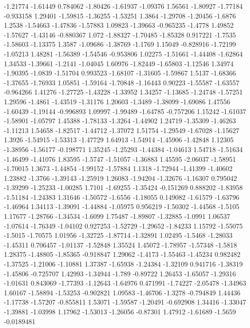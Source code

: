 \documentclass[9pt]{article}
\theoremstyle{plain}
\theoremstyle{definition}
\theoremstyle{remark}
\numberwithin{equation}{section}
\begin{document}
-1.21774
-1.61449
0.784062
-1.80426
-1.61937
-1.09376
1.56561
-1.80927
-1.77184
-0.933158
1.29401
-1.59815
-1.36255
-1.53251
1.3864
-1.29708
-1.20456
-1.6876
1.2538
-1.54663
-1.47836
-1.57883
1.09823
-1.39663
-0.965235
-1.4778
1.49852
-1.57627
-1.43146
-0.880367
1.072
-1.88327
-1.70485
-1.85328
0.917221
-1.7535
-1.58603
-1.13375
1.3587
-1.09686
-1.38769
-1.1769
1.15049
-0.828916
-1.72199
-1.05213
1.48281
-1.56389
-1.54546
-0.953806
1.02275
-1.51661
-1.44408
-1.62864
1.34533
-1.39661
-1.2141
-1.04045
1.60976
-1.82449
-1.65803
-1.12546
1.34974
-1.90395
-1.0839
-1.51704
0.993523
-1.68107
-1.31605
-1.59867
1.5137
-1.68366
-1.37655
-1.76933
1.05851
-1.59164
-1.70848
-1.16443
0.90223
-1.55587
-1.63557
-0.964266
1.41276
-1.27725
-1.43228
-1.33952
1.34257
-1.13685
-1.24748
-1.57251
1.29596
-1.4861
-1.43519
-1.31176
1.20603
-1.3489
-1.38099
-1.69086
1.47556
-1.60439
-1.19144
-0.996893
1.09997
-1.99489
-1.64785
-0.757206
1.15242
-1.61037
-1.58901
-1.05797
1.45388
-1.78133
-1.3264
-1.44902
1.24719
-1.35309
-1.46263
-1.11213
1.54658
-1.82517
-1.44712
-1.37072
1.51754
-1.29549
-1.67028
-1.15627
1.3926
-1.54915
-1.53313
-1.47729
1.64913
-1.54914
-1.45906
-1.42848
1.12305
-1.38956
-1.56177
-0.198771
1.35245
-1.25293
-1.44384
-1.04613
1.54718
-1.51634
-1.46499
-1.41076
1.83595
-1.5747
-1.51057
-1.36883
1.45595
-2.06037
-1.58951
-1.70015
1.3673
-1.44854
-1.99152
-1.57884
1.1318
-1.72944
-1.41399
-1.40602
1.23882
-1.3766
-1.39143
-1.25919
1.26083
-1.94204
-1.32676
-1.16307
0.795042
-1.39299
-1.25233
-1.00285
1.7101
-1.69255
-1.35424
-0.151269
0.888202
-1.83958
-1.51184
-1.24383
1.31646
-1.50572
-1.6556
-1.18055
0.149082
-1.61579
-1.63796
-1.46964
1.34113
-1.39091
-1.44884
-1.05975
0.956219
-1.50302
-1.44568
-1.5105
1.17677
-1.28766
-1.34534
-1.6099
1.75487
-1.89807
-1.32885
-1.0991
1.06537
-1.07614
-1.76349
-1.04102
0.927253
-1.52729
-1.29652
-1.84233
1.15792
-1.55075
-1.5015
-1.70575
1.01956
-1.32725
-1.87714
-1.32891
1.02495
-1.5468
-1.28033
-1.45311
0.706457
-1.01137
-1.52848
1.35524
1.45072
-1.78957
-1.57348
-1.5818
1.28375
-1.48805
-1.85365
-0.918847
1.29062
-1.4173
-1.55463
-1.45234
0.982482
-1.37525
-1.21006
-1.10881
1.37387
-1.65938
-1.24384
-1.32109
0.941716
-1.38319
-1.45806
-0.725707
1.42993
-1.34944
-1.789
-0.89722
1.26453
-1.65057
-1.29316
-1.01631
0.843069
-1.77393
-1.12643
-1.64976
0.471991
-1.74227
-2.05478
-1.34963
1.60167
-1.58894
-1.53253
-0.902821
1.09583
-1.46706
-1.3278
-0.794849
1.44436
-1.17738
-1.57207
-0.855811
1.53071
-1.59587
-1.20491
-0.692908
1.34416
-1.33047
-1.39881
-1.03998
1.17962
-1.53013
-1.26056
-0.87301
1.47912
-1.61689
-1.5659
-0.0189481
\end{document}
